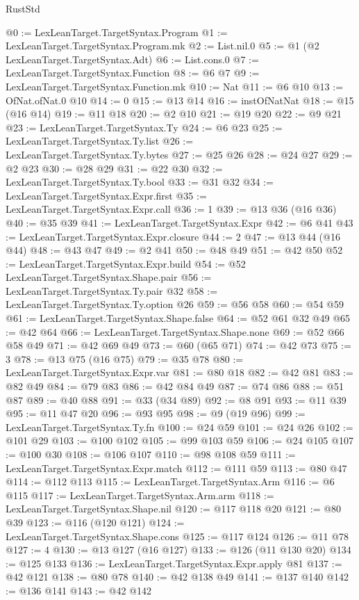 \begin{lexlean}{RustStd}
\begin{coremodule}
{\begin{coremodule}
{{{{{{{{{{@0 := LexLeanTarget.TargetSyntax.Program
@1 := LexLeanTarget.TargetSyntax.Program.mk
@2 := List.nil.{0}
@5 := @1 (@2 LexLeanTarget.TargetSyntax.Adt)
@6 := List.cons.{0}
@7 := LexLeanTarget.TargetSyntax.Function
@8 := @6 @7
@9 := LexLeanTarget.TargetSyntax.Function.mk
@10 := Nat
@11 := @6 @10
@13 := OfNat.ofNat.{0} @10
@14 := 0
@15 := @13 @14
@16 := instOfNatNat
@18 := @15 (@16 @14)
@19 := @11 @18
@20 := @2 @10
@21 := @19 @20
@22 := @9 @21
@23 := LexLeanTarget.TargetSyntax.Ty
@24 := @6 @23
@25 := LexLeanTarget.TargetSyntax.Ty.list
@26 := LexLeanTarget.TargetSyntax.Ty.bytes
@27 := @25 @26
@28 := @24 @27
@29 := @2 @23
@30 := @28 @29
@31 := @22 @30
@32 := LexLeanTarget.TargetSyntax.Ty.bool
@33 := @31 @32
@34 := LexLeanTarget.TargetSyntax.Expr.first
@35 := LexLeanTarget.TargetSyntax.Expr.call
@36 := 1
@39 := @13 @36 (@16 @36)
@40 := @35 @39
@41 := LexLeanTarget.TargetSyntax.Expr
@42 := @6 @41
@43 := LexLeanTarget.TargetSyntax.Expr.closure
@44 := 2
@47 := @13 @44 (@16 @44)
@48 := @43 @47
@49 := @2 @41
@50 := @48 @49
@51 := @42 @50
@52 := LexLeanTarget.TargetSyntax.Expr.build
@54 := @52 LexLeanTarget.TargetSyntax.Shape.pair
@56 := LexLeanTarget.TargetSyntax.Ty.pair @32
@58 := LexLeanTarget.TargetSyntax.Ty.option @26
@59 := @56 @58
@60 := @54 @59
@61 := LexLeanTarget.TargetSyntax.Shape.false
@64 := @52 @61 @32 @49
@65 := @42 @64
@66 := LexLeanTarget.TargetSyntax.Shape.none
@69 := @52 @66 @58 @49
@71 := @42 @69 @49
@73 := @60 (@65 @71)
@74 := @42 @73
@75 := 3
@78 := @13 @75 (@16 @75)
@79 := @35 @78
@80 := LexLeanTarget.TargetSyntax.Expr.var
@81 := @80 @18
@82 := @42 @81
@83 := @82 @49
@84 := @79 @83
@86 := @42 @84 @49
@87 := @74 @86
@88 := @51 @87
@89 := @40 @88
@91 := @33 (@34 @89)
@92 := @8 @91
@93 := @11 @39
@95 := @11 @47 @20
@96 := @93 @95
@98 := @9 (@19 @96)
@99 := LexLeanTarget.TargetSyntax.Ty.fn
@100 := @24 @59
@101 := @24 @26
@102 := @101 @29
@103 := @100 @102
@105 := @99 @103 @59
@106 := @24 @105
@107 := @100 @30
@108 := @106 @107
@110 := @98 @108 @59
@111 := LexLeanTarget.TargetSyntax.Expr.match
@112 := @111 @59
@113 := @80 @47
@114 := @112 @113
@115 := LexLeanTarget.TargetSyntax.Arm
@116 := @6 @115
@117 := LexLeanTarget.TargetSyntax.Arm.arm
@118 := LexLeanTarget.TargetSyntax.Shape.nil
@120 := @117 @118 @20
@121 := @80 @39
@123 := @116 (@120 @121)
@124 := LexLeanTarget.TargetSyntax.Shape.cons
@125 := @117 @124
@126 := @11 @78
@127 := 4
@130 := @13 @127 (@16 @127)
@133 := @126 (@11 @130 @20)
@134 := @125 @133
@136 := LexLeanTarget.TargetSyntax.Expr.apply @81
@137 := @42 @121
@138 := @80 @78
@140 := @42 @138 @49
@141 := @137 @140
@142 := @136 @141
@143 := @42 @142
}}}}}}}}}}
\end{coremodule}}
\end{coremodule}
\end{lexlean}
